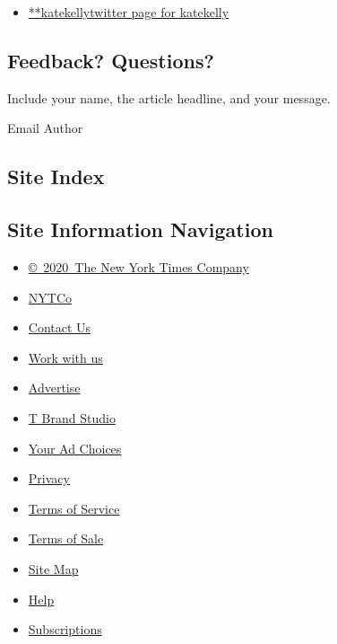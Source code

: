 \begin{itemize}
\tightlist
\item
  \href{https://twitter.com/katekelly}{**katekellytwitter page for
  katekelly}
\end{itemize}

\hypertarget{feedback-questions}{%
\subsection{Feedback? Questions?}\label{feedback-questions}}

Include your name, the article headline, and your message.

Email Author

\hypertarget{site-index}{%
\subsection{Site Index}\label{site-index}}

\hypertarget{site-information-navigation}{%
\subsection{Site Information
Navigation}\label{site-information-navigation}}

\begin{itemize}
\tightlist
\item
  \href{https://help.nytimes3xbfgragh.onion/hc/en-us/articles/115014792127-Copyright-notice}{©~2020~The
  New York Times Company}
\end{itemize}

\begin{itemize}
\tightlist
\item
  \href{https://www.nytco.com/}{NYTCo}
\item
  \href{https://help.nytimes3xbfgragh.onion/hc/en-us/articles/115015385887-Contact-Us}{Contact
  Us}
\item
  \href{https://www.nytco.com/careers/}{Work with us}
\item
  \href{https://nytmediakit.com/}{Advertise}
\item
  \href{http://www.tbrandstudio.com/}{T Brand Studio}
\item
  \href{https://www.nytimes3xbfgragh.onion/privacy/cookie-policy\#how-do-i-manage-trackers}{Your
  Ad Choices}
\item
  \href{https://www.nytimes3xbfgragh.onion/privacy}{Privacy}
\item
  \href{https://help.nytimes3xbfgragh.onion/hc/en-us/articles/115014893428-Terms-of-service}{Terms
  of Service}
\item
  \href{https://help.nytimes3xbfgragh.onion/hc/en-us/articles/115014893968-Terms-of-sale}{Terms
  of Sale}
\item
  \href{https://spiderbites.nytimes3xbfgragh.onion}{Site Map}
\item
  \href{https://help.nytimes3xbfgragh.onion/hc/en-us}{Help}
\item
  \href{https://www.nytimes3xbfgragh.onion/subscription?campaignId=37WXW}{Subscriptions}
\end{itemize}
